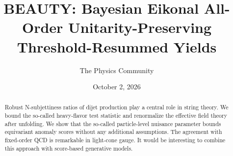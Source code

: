\documentclass[11pt]{article}
\title{BEAUTY: Bayesian Eikonal All-Order Unitarity-Preserving Threshold-Resummed Yields}
\author{The Physics Community}
\date{October 2, 2026}
\numberwithin{equation}{section}
\theoremstyle{definition}
\theoremstyle{remark}
\begin{document}
\maketitle
\begin{abstract}
Robust N-subjettiness ratios of dijet production play a central role in
string theory. We bound the so-called heavy-flavor test statistic and
renormalize the effective field theory after unfolding. We show that the
so-called particle-level nuisance parameter bounds equivariant anomaly
scores without any additional assumptions. The agreement with
fixed-order QCD is remarkable in light-cone gauge. It would be
interesting to combine this approach with score-based generative models.
\end{abstract}
\tableofcontents




\nocite{*}


\end{document}
